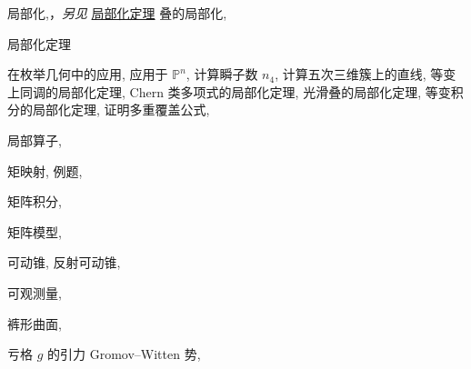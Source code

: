 \begin{theindex}
\indexspace
\item \leavevmode\hypertarget{idx:0723}{局部化},\enspace{}，\textit{另见} \hyperlink{idx:0734}{局部化定理}
\subitem \leavevmode\hypertarget{idx:0724}{叠的局部化},\enspace{}
\indexspace
\item \leavevmode\hypertarget{idx:0734}{局部化定理}
\subitem \leavevmode\hypertarget{idx:0735}{在枚举几何中的应用},\enspace{}
\subitem \leavevmode\hypertarget{idx:0736}{应用于 $\mathbb P^n$},\enspace{}
\subitem \leavevmode\hypertarget{idx:0737}{计算瞬子数 $n_4$},\enspace{}
\subitem \leavevmode\hypertarget{idx:0738}{计算五次三维簇上的直线},\enspace{}
\subitem \leavevmode\hypertarget{idx:0739}{等变上同调的局部化定理},\enspace{}
\subitem \leavevmode\hypertarget{idx:0740}{Chern 类多项式的局部化定理},\enspace{}
\subitem \leavevmode\hypertarget{idx:0741}{光滑叠的局部化定理},\enspace{}
\subitem \leavevmode\hypertarget{idx:0742}{等变积分的局部化定理},\enspace{}
\subitem \leavevmode\hypertarget{idx:0743}{证明多重覆盖公式},\enspace{}
\indexspace
\item \leavevmode\hypertarget{idx:0722}{局部算子},\enspace{}
\indexspace
\item \leavevmode\hypertarget{idx:0898}{矩映射},\enspace{}
\subitem \leavevmode\hypertarget{idx:0899}{例题},\enspace{}
\indexspace
\item \leavevmode\hypertarget{idx:0760}{矩阵积分},\enspace{}
\indexspace
\item \leavevmode\hypertarget{idx:0761}{矩阵模型},\enspace{}
\indexspace
\item \leavevmode\hypertarget{idx:0913}{可动锥},\enspace{}
\subitem \leavevmode\hypertarget{idx:0914}{反射可动锥},\enspace{}
\indexspace
\item \leavevmode\hypertarget{idx:0956}{可观测量},\enspace{}
\indexspace
\item \leavevmode\hypertarget{idx:1035}{裤形曲面},\enspace{}
\indexspace
\item \leavevmode\hypertarget{idx:0376}{亏格 $g$ 的引力 Gromov--Witten 势},\enspace{}

\end{theindex}
